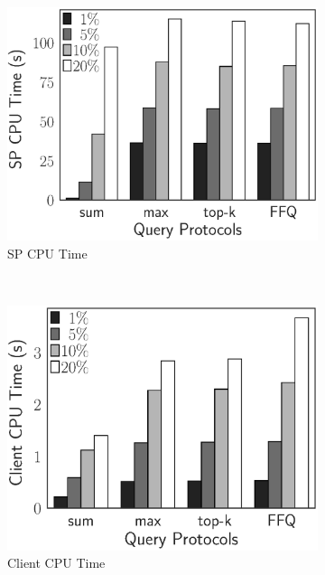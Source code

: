 \begin{figure}[t]
  \centering
  \begin{subfigure}[b]{.33\linewidth}
    \centering
    \includegraphics[height=\ht\figbox]{exp-figs/aggregate-queries/foodmarket_sp.eps}
    \caption{SP CPU Time}
  \end{subfigure}~%
  \begin{subfigure}[b]{.33\linewidth}
    \centering
    \includegraphics[height=\ht\figbox]{exp-figs/aggregate-queries/foodmarket_client.eps}
    \caption{Client CPU Time}
  \end{subfigure}~%
  \begin{subfigure}[b]{.33\linewidth}
    \centering

\end{subfigure}
\end{figure}
